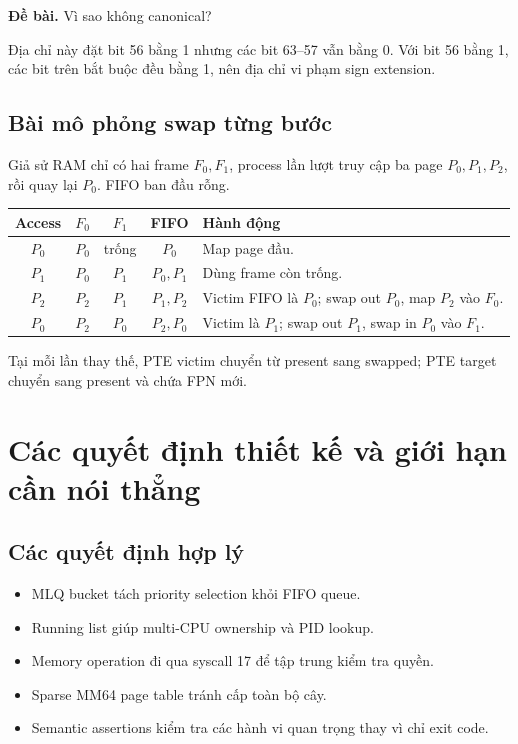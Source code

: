 \documentclass[12pt,a4paper]{article}
\newcommand{\code}[1]{\texttt{\detokenize{#1}}}
\begin{document}
\textbf{Đề bài.} Vì sao \code{0x100000000000000} không canonical?

Địa chỉ này đặt bit 56 bằng 1 nhưng các bit 63--57 vẫn bằng 0. Với bit 56 bằng
1, các bit trên bắt buộc đều bằng 1, nên địa chỉ vi phạm sign extension.

\subsection{Bài mô phỏng swap từng bước}

Giả sử RAM chỉ có hai frame \(F_0,F_1\), process lần lượt truy cập ba page
\(P_0,P_1,P_2\), rồi quay lại \(P_0\). FIFO ban đầu rỗng.

\begin{longtable}{|c|c|c|c|p{5.5cm}|}
\hline
\textbf{Access} & \textbf{\(F_0\)} & \textbf{\(F_1\)} &
\textbf{FIFO} & \textbf{Hành động}\\ \hline
\(P_0\) & \(P_0\) & trống & \(P_0\) & Map page đầu.\\ \hline
\(P_1\) & \(P_0\) & \(P_1\) & \(P_0,P_1\) & Dùng frame còn trống.\\ \hline
\(P_2\) & \(P_2\) & \(P_1\) & \(P_1,P_2\) & Victim FIFO là \(P_0\);
swap out \(P_0\), map \(P_2\) vào \(F_0\).\\ \hline
\(P_0\) & \(P_2\) & \(P_0\) & \(P_2,P_0\) & Victim là \(P_1\); swap out
\(P_1\), swap in \(P_0\) vào \(F_1\).\\ \hline
\end{longtable}

Tại mỗi lần thay thế, PTE victim chuyển từ present sang swapped; PTE target
chuyển sang present và chứa FPN mới.

\section{Các quyết định thiết kế và giới hạn cần nói thẳng}

\subsection{Các quyết định hợp lý}

\begin{itemize}
  \item MLQ bucket tách priority selection khỏi FIFO queue.
  \item Running list giúp multi-CPU ownership và PID lookup.
  \item Memory operation đi qua syscall 17 để tập trung kiểm tra quyền.
  \item Sparse MM64 page table tránh cấp toàn bộ cây.
  \item Semantic assertions kiểm tra các hành vi quan trọng thay vì chỉ exit
  code.
\end{itemize}
\end{document}
